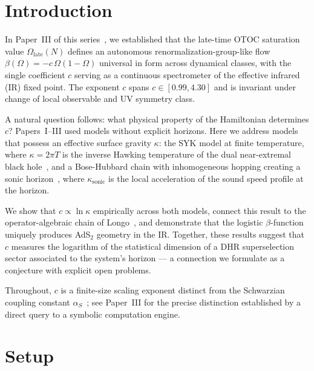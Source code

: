\documentclass[aps,prl,twocolumn,superscriptaddress,showpacs]{revtex4-2}
\newcommand{\late}{\mathrm{late}}
\begin{document}
\maketitle

\section{Introduction}

In Paper~III of this series~\cite{PerezEugenio2026c}, we established that
the late-time OTOC saturation value $\Omega_\late(N)$ defines an autonomous
renormalization-group-like flow $\beta(\Omega) = -c\,\Omega(1-\Omega)$
universal in form across dynamical classes, with the single coefficient $c$
serving as a continuous spectrometer of the effective infrared (IR) fixed
point. The exponent $c$ spans $c \in [0.99, 4.30]$ and is invariant under
change of local observable and UV symmetry class.

A natural question follows: what physical property of the Hamiltonian
determines $c$? Papers~I--III used models without explicit horizons. Here
we address models that possess an effective surface gravity $\kappa$: the
SYK model at finite temperature, where $\kappa = 2\pi T$ is the inverse
Hawking temperature of the dual near-extremal black hole~\cite{Maldacena2016},
and a Bose-Hubbard chain with inhomogeneous hopping creating a sonic
horizon~\cite{Unruh1981}, where $\kappa_\mathrm{sonic}$ is the local
acceleration of the sound speed profile at the horizon.

We show that $c \propto \ln\kappa$ empirically across both models, connect
this result to the operator-algebraic chain of Longo~\cite{Longo2001}, and
demonstrate that the logistic $\beta$-function uniquely produces AdS$_2$
geometry in the IR. Together, these results suggest that $c$ measures the
logarithm of the statistical dimension of a DHR superselection sector
associated to the system's horizon --- a connection we formulate as a
conjecture with explicit open problems.

Throughout, $c$ is a finite-size scaling exponent distinct from the
Schwarzian coupling constant $\alpha_S$~\cite{Kitaev2015,Maldacena2016};
see Paper~III for the precise distinction established by a direct query to
a symbolic computation engine.

\section{Setup}
\end{document}
